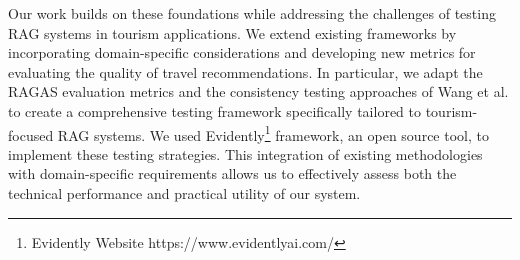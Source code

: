 Our work builds on these foundations while addressing the challenges of testing RAG systems in tourism applications. We extend existing frameworks by incorporating domain-specific considerations and developing new metrics for evaluating the quality of travel recommendations. In particular, we adapt the RAGAS evaluation metrics and the consistency testing approaches of Wang et al. to create a comprehensive testing framework specifically tailored to tourism-focused RAG systems. We used Evidently\footnote{Evidently Website https://www.evidentlyai.com/} framework, an open source tool, to implement these testing strategies. This integration of existing methodologies with domain-specific requirements allows us to effectively assess both the technical performance and practical utility of our system.








